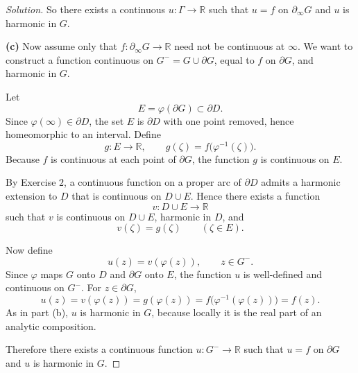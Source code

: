 \documentclass[12pt, a4paper]{report}
\theoremstyle{spaced}
\begin{document}
\begin{proof}[Solution]
	So there exists a continuous \(u:\Gamma\to \mathbb R\) such that \(u=f\) on \(\partial_\infty G\) and \(u\) is harmonic in \(G\).

	\medskip

	\textbf{(c)} Now assume only that \(f:\partial_\infty G\to \mathbb R\) need not be continuous at \(\infty\). We want to construct a function continuous on \(G^- = G\cup \partial G\), equal to \(f\) on \(\partial G\), and harmonic in \(G\).

	Let
	\[
		E=\varphi(\partial G)\subset \partial D.
	\]
	Since \(\varphi(\infty)\in \partial D\), the set \(E\) is \(\partial D\) with one point removed, hence homeomorphic to an interval. Define
	\[
		g:E\to \mathbb R,\qquad g(\zeta)=f\bigl(\varphi^{-1}(\zeta)\bigr).
	\]
	Because \(f\) is continuous at each point of \(\partial G\), the function \(g\) is continuous on \(E\).

	By Exercise \(2\), a continuous function on a proper arc of \(\partial D\) admits a harmonic extension to \(D\) that is continuous on \(D\cup E\). Hence there exists a function
	\[
		v:D\cup E\to \mathbb R
	\]
	such that \(v\) is continuous on \(D\cup E\), harmonic in \(D\), and
	\[
		v(\zeta)=g(\zeta)\qquad (\zeta\in E).
	\]

	Now define
	\[
		u(z)=v(\varphi(z)),\qquad z\in G^-.
	\]
	Since \(\varphi\) maps \(G\) onto \(D\) and \(\partial G\) onto \(E\), the function \(u\) is well-defined and continuous on \(G^-\). For \(z\in \partial G\),
	\[
		u(z)=v(\varphi(z))=g(\varphi(z))
		=f\bigl(\varphi^{-1}(\varphi(z))\bigr)=f(z).
	\]
	As in part (b), \(u\) is harmonic in \(G\), because locally it is the real part of an analytic composition.

	Therefore there exists a continuous function \(u:G^-\to \mathbb R\) such that \(u=f\) on \(\partial G\) and \(u\) is harmonic in \(G\).
\end{proof}
\end{document}
